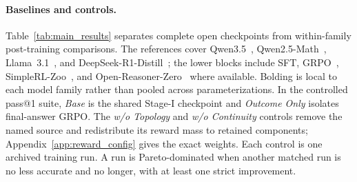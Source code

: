 \paragraph{Baselines and controls.}
Table~\ref{tab:main_results} separates complete open checkpoints from within-family post-training comparisons. The references cover Qwen3.5~\citep{qwen35team2026_2b,qwen35team2026_4b}, Qwen2.5-Math~\citep{yang2024qwen2}, Llama~3.1~\citep{grattafiori2024llama}, and DeepSeek-R1-Distill~\citep{deepseekr1}; the lower blocks include SFT, GRPO~\citep{shao2024deepseekmath}, SimpleRL-Zoo~\citep{zeng2025simplerlzoo}, and Open-Reasoner-Zero~\citep{hu2026open} where available. Bolding is local to each model family rather than pooled across parameterizations. In the controlled pass@1 suite, \emph{Base} is the shared Stage-I checkpoint and \emph{Outcome Only} isolates final-answer GRPO. The \emph{w/o Topology} and \emph{w/o Continuity} controls remove the named source and redistribute its reward mass to retained components; Appendix~\ref{app:reward_config} gives the exact weights. Each control is one archived training run. A run is Pareto-dominated when another matched run is no less accurate and no longer, with at least one strict improvement.




